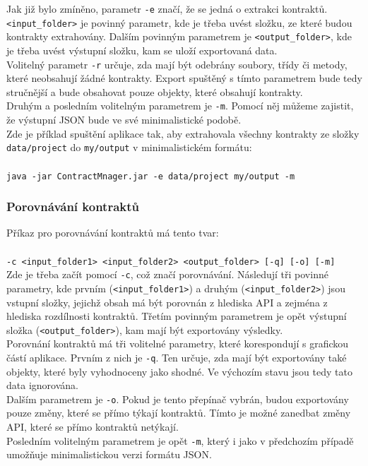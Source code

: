 			Jak již bylo zmíněno, parametr \texttt{-e} značí, že se jedná o extrakci kontraktů. \texttt{<input\_folder>} je povinný parametr, kde je třeba uvést složku, ze které budou kontrakty extrahovány. Dalším povinným parametrem je \texttt{<output\_folder>}, kde je třeba uvést výstupní složku, kam se uloží exportovaná data.\\
			
			Volitelný parametr \texttt{-r} určuje, zda mají být odebrány soubory, třídy či metody, které neobsahují žádné kontrakty. Export spuštěný s tímto parametrem bude tedy stručnější a bude obsahovat pouze objekty, které obsahují kontrakty.\\
			
			Druhým a posledním volitelným parametrem je \texttt{-m}. Pomocí něj můžeme zajistit, že výstupní JSON bude ve své minimalistické podobě.\\
			
			Zde je příklad spuštění aplikace tak, aby extrahovala všechny kontrakty ze složky \texttt{data/project} do \texttt{my/output} v minimalistickém formátu:\\\\
			\- \- \- \texttt{java -jar ContractMnager.jar -e data/project my/output -m}
			
		\subsubsection{Porovnávání kontraktů}
			Příkaz pro porovnávání kontraktů má tento tvar:\\\\
			\- \- \- \texttt{-c <input\_folder1> <input\_folder2> <output\_folder> [-q] [-o] [-m]}\\
			
			Zde je třeba začít pomocí \texttt{-c}, což značí porovnávání. Následují tři povinné parametry, kde prvním (\texttt{<input\_folder1>}) a druhým (\texttt{<input\_folder2>}) jsou vstupní složky, jejichž obsah má být porovnán z hlediska API a zejména z hlediska rozdílnosti kontraktů. Třetím povinným parametrem je opět výstupní složka (\texttt{<output\_folder>}), kam mají být exportovány výsledky.\\
			
			Porovnání kontraktů má tři volitelné parametry, které korespondují s grafickou částí aplikace. Prvním z nich je \texttt{-q}. Ten určuje, zda mají být exportovány také objekty, které byly vyhodnoceny jako shodné. Ve výchozím stavu jsou tedy tato data ignorována.\\
			
			Dalším parametrem je \texttt{-o}. Pokud je tento přepínač vybrán, budou exportovány pouze změny, které se přímo týkají kontraktů. Tímto je možné zanedbat změny API, které se přímo kontraktů netýkají.\\
			
			Posledním volitelným parametrem je opět \texttt{-m}, který i jako v předchozím případě umožňuje minimalistickou verzi formátu JSON.